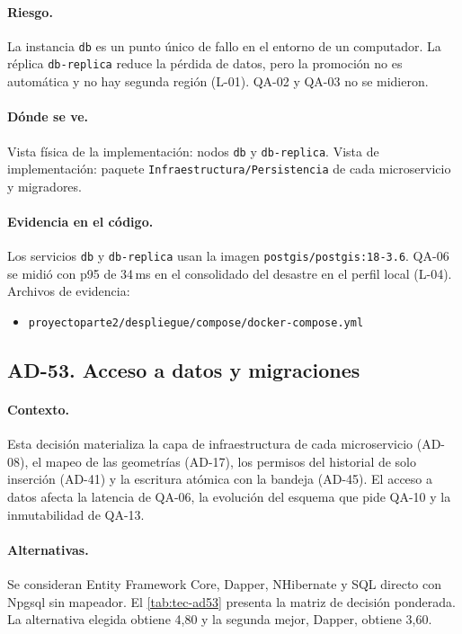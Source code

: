 \paragraph{Riesgo.} La instancia \texttt{db} es un punto único de fallo en el entorno de un computador.
La réplica \texttt{db-replica} reduce la pérdida de datos, pero la promoción no es automática y no hay segunda región (L-01).
QA-02 y QA-03 no se midieron.

\paragraph{Dónde se ve.} Vista física de la implementación: nodos \texttt{db} y \texttt{db-replica}.
Vista de implementación: paquete \texttt{Infraestructura/Persistencia} de cada microservicio y migradores.

\paragraph{Evidencia en el código.} Los servicios \texttt{db} y \texttt{db-replica} usan la imagen \texttt{postgis/postgis:18-3.6}. QA-06 se midió con p95 de 34\,ms en el consolidado del desastre en el perfil local (L-04).
Archivos de evidencia:
{\raggedright
\begin{itemize}
  \item \texttt{proyectoparte2/\br{}despliegue/\br{}compose/\br{}docker-compose.yml}
\end{itemize}
\par}

\subsection{AD-53. Acceso a datos y migraciones}
\label{sec:tec-ad53}

\paragraph{Contexto.} Esta decisión materializa la capa de infraestructura de cada microservicio (AD-08), el mapeo de las geometrías (AD-17), los permisos del historial de solo inserción (AD-41) y la escritura atómica con la bandeja (AD-45).
El acceso a datos afecta la latencia de QA-06, la evolución del esquema que pide QA-10 y la inmutabilidad de QA-13.

\paragraph{Alternativas.} Se consideran Entity Framework Core, Dapper, NHibernate y SQL directo con Npgsql sin mapeador.
El \cref{tab:tec-ad53} presenta la matriz de decisión ponderada.
La alternativa elegida obtiene 4,80 y la segunda mejor, Dapper, obtiene 3,60.

